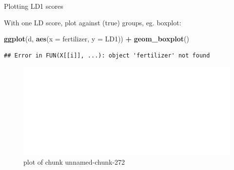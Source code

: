 \documentclass[ignorenonframetext,]{beamer}
\newenvironment{Shaded}{\begin{snugshade}}{\end{snugshade}}
\newcommand{\DataTypeTok}[1]{\textcolor[rgb]{0.13,0.29,0.53}{#1}}
\newcommand{\KeywordTok}[1]{\textcolor[rgb]{0.13,0.29,0.53}{\textbf{#1}}}
\newcommand{\NormalTok}[1]{#1}
\newcommand{\OperatorTok}[1]{\textcolor[rgb]{0.81,0.36,0.00}{\textbf{#1}}}
\newcommand{\StringTok}[1]{\textcolor[rgb]{0.31,0.60,0.02}{#1}}
\begin{document}
\begin{frame}[fragile]{Plotting LD1 scores}
\protect\hypertarget{plotting-ld1-scores}{}

With one LD score, plot against (true) groups, eg. boxplot:

\begin{Shaded}
\begin{Highlighting}[]
\KeywordTok{ggplot}\NormalTok{(d, }\KeywordTok{aes}\NormalTok{(}\DataTypeTok{x =}\NormalTok{ fertilizer, }\DataTypeTok{y =}\NormalTok{ LD1)) }\OperatorTok{+}\StringTok{ }\KeywordTok{geom_boxplot}\NormalTok{()}
\end{Highlighting}
\end{Shaded}

\begin{verbatim}
## Error in FUN(X[[i]], ...): object 'fertilizer' not found
\end{verbatim}

\begin{figure}
\centering
\includegraphics{figure/unnamed-chunk-272-1.pdf}
\caption{plot of chunk unnamed-chunk-272}
\end{figure}

\end{frame}
\end{document}
